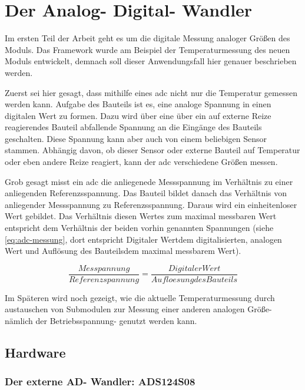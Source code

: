 \thispagestyle{firstPage}

\section{Der Analog- Digital- Wandler}
\label{sec:ad-wandler}

Im ersten Teil der Arbeit geht es um die digitale Messung analoger Größen des Moduls.
Das Framework wurde am Beispiel der Temperaturmessung des neuen Moduls entwickelt, demnach soll dieser Anwendungsfall hier genauer beschrieben werden.

Zuerst sei hier gesagt, dass mithilfe eines \ac{adc} nicht nur die Temperatur gemessen werden kann.
Aufgabe des Bauteils ist es, eine analoge Spannung in einen digitalen Wert zu formen.
Dazu wird über eine über ein auf externe Reize reagierendes Bauteil abfallende Spannung an die Eingänge des Bauteils geschalten.
Diese Spannung kann aber auch von einem beliebigen Sensor stammen.
Abhängig davon, ob dieser Sensor oder externe Bauteil auf Temperatur oder eben andere Reize reagiert, kann der \ac{adc} verschiedene Größen messen.

Grob gesagt misst ein \ac{adc} die anliegenede Messspannung im Verhältnis zu einer anliegenden Referenzsspannung.
Das Bauteil bildet danach das Verhältnis von anliegender Messspannung zu Referenzsspannung.
Daraus wird ein einheitenloser Wert gebildet.
Das Verhältnis diesen Wertes zum maximal messbaren Wert entspricht dem Verhältnis der beiden vorhin genannten Spannungen (siehe \autoref{eq:adc-messung}, dort entspricht \glqq Digitaler Wert\grqq dem digitalisierten, analogen Wert und \glqq Auflösung des Bauteils\grqq dem maximal messbarem Wert).

\begin{equation}
    \frac{Messpannung}{Referenzspannung} = \frac{Digitaler Wert}{Aufloesung des Bauteils}
    \label{eq:adc-messung}
\end{equation}

Im Späteren wird noch gezeigt, wie die aktuelle Temperaturmessung durch austauschen von Submodulen zur Messung einer anderen analogen Größe- nämlich der Betriebsspannung- genutzt werden kann.

\subsection{Hardware}
\label{subsec:hardware}

\subsubsection{Der externe AD- Wandler: ADS124S08}
\label{subsubsec:external-adc}


